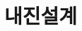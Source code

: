 \documentclass[12pt, a4paper, oneside]{book}
\begin{document}
	\clearpage
	\chapter{내진설계}


	
	
	
	
	



	

\end{document}
